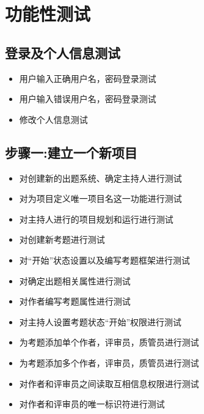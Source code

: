 \documentclass[hyperref, a4paper]{ctexart}
\providecommand{\tightlist}{%
  \setlength{\itemsep}{0pt}\setlength{\parskip}{0pt}}
\begin{document}
\hypertarget{ux529fux80fdux6027ux6d4bux8bd5}{%
\section{功能性测试}\label{ux529fux80fdux6027ux6d4bux8bd5}}

\hypertarget{ux767bux5f55ux53caux4e2aux4ebaux4fe1ux606fux6d4bux8bd5}{%
\subsection{登录及个人信息测试}\label{ux767bux5f55ux53caux4e2aux4ebaux4fe1ux606fux6d4bux8bd5}}

\begin{itemize}
\tightlist
\item
  用户输入正确用户名，密码登录测试
\item
  用户输入错误用户名，密码登录测试
\item
  修改个人信息测试
\end{itemize}

\hypertarget{ux6b65ux9aa4ux4e00ux5efaux7acbux4e00ux4e2aux65b0ux9879ux76ee}{%
\subsection{步骤一:建立一个新项目}\label{ux6b65ux9aa4ux4e00ux5efaux7acbux4e00ux4e2aux65b0ux9879ux76ee}}

\begin{itemize}
\tightlist
\item
  对创建新的出题系统、确定主持人进行测试
\item
  对为项目定义唯一项目名这一功能进行测试
\item
  对主持人进行的项目规划和运行进行测试
\item
  对创建新考题进行测试
\item
  对``开始''状态设置以及编写考题框架进行测试
\item
  对确定出题相关属性进行测试
\item
  对作者编写考题属性进行测试
\item
  对主持人设置考题状态``开始''权限进行测试
\item
  为考题添加单个作者，评审员，质管员进行测试
\item
  为考题添加多个作者，评审员，质管员进行测试
\item
  对作者和评审员之间读取互相信息权限进行测试
\item
  对作者和评审员的唯一标识符进行测试
\end{itemize}
\end{document}
